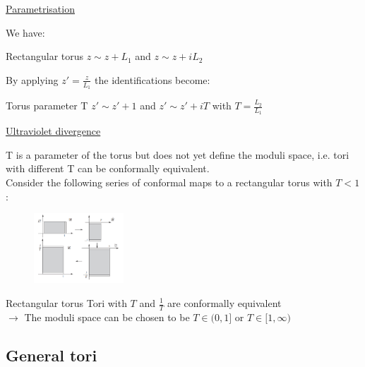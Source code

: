 \documentclass[11pt,aspectratio=169]{beamer}
\begin{document}
\begin{frame}{\underline{Parametrisation}}

	We have:
	\\
	\begin{block}{Rectangular torus}
		$z \sim z + L_1$ and $z \sim z + iL_2$
	\end{block}
	\bigskip
	By applying $z' = \frac{z}{L_1}$ the identifications become:
	\begin{block}{Torus parameter T}
		$z' \sim z' + 1$ and $z' \sim z' + iT$ with $T = \frac{L_2}{L_1}$
	\end{block}

\end{frame}

\begin{frame}{\underline{Ultraviolet divergence}}

	T is a parameter of the torus but does not yet define the moduli space, i.e. tori with different T can be conformally equivalent.
	\\
	Consider the following series of conformal maps to a rectangular torus with $T<1$:

	\begin{figure}[htbp]
		\centering
		\includegraphics[width = 0.30\textwidth]{elements/three maps.PNG}
	\end{figure}
	\begin{block}{Rectangular torus}
		Tori with $T$ and $\frac{1}{T}$ are conformally equivalent
		\\
		$\rightarrow$ The moduli space can be chosen to be $T \in (0,1]$ or $T \in [1, \infty)$
	\end{block}
	
\end{frame}

\subsection{General tori}
\end{document}

